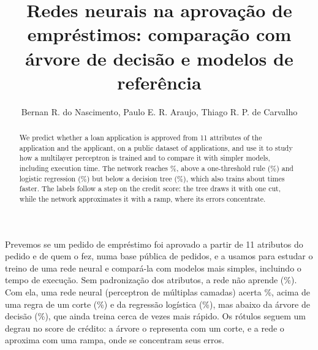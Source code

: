 \documentclass[12pt]{article}
\title{Redes neurais na aprovação de empréstimos: comparação com árvore de decisão e modelos de referência}
\author{Bernan R. do Nascimento\inst{1}, Paulo E. R. Araujo\inst{1}, Thiago R. P. de Carvalho\inst{1}}
\begin{document}
\maketitle

\begin{abstract}
  We predict whether a loan application is approved from 11 attributes of the application and the
  applicant, on a public dataset of \rnLinhasEn{} applications, and use it to study how a multilayer
  perceptron is trained and to compare it with simpler models, including execution time. The network
  reaches \rnAccRedeEn\%, above a one-threshold rule (\rnAccRegraEn\%) and logistic regression
  (\rnAccLogEn\%) but below a decision tree (\rnAccArvEn\%), which also trains about \rnRazaoTreino{}
  times faster. The labels follow a step on the credit score: the tree draws it with one cut, while the
  network approximates it with a ramp, where its errors concentrate.
\end{abstract}

\begin{resumo}
  Prevemos se um pedido de empréstimo foi aprovado a partir de 11 atributos do pedido e de quem o fez,
  numa base pública de \rnLinhas{} pedidos, e a usamos para estudar o treino de uma rede neural e
  compará-la com modelos mais simples, incluindo o tempo de execução. Sem padronização dos atributos, a
  rede não aprende (\rnSemPadAcc\%). Com ela, uma rede neural (perceptron de múltiplas camadas) acerta
  \rnAccRede\%, acima de uma regra de um corte (\rnAccRegra\%) e da regressão logística (\rnAccLog\%),
  mas abaixo da árvore de decisão (\rnAccArv\%), que ainda treina cerca de \rnRazaoTreino{} vezes mais
  rápido. Os rótulos seguem um degrau no score de crédito: a árvore o representa com um corte, e a rede
  o aproxima com uma rampa, onde se concentram seus erros.
\end{resumo}












\end{document}

